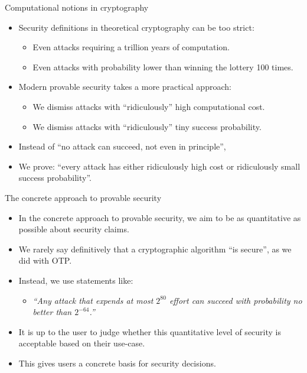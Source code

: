 \documentclass[aspectratio=169, lualatex, handout]{beamer}
\begin{document}
\begin{frame}{Computational notions in cryptography}
	\begin{itemize}
		\item Security definitions in theoretical cryptography can be too strict:
		      \begin{itemize}
			      \item Even attacks requiring a trillion years of computation.
			      \item Even attacks with probability lower than winning the lottery 100 times.
		      \end{itemize}
		\item Modern provable security takes a more practical approach:
		      \begin{itemize}
			      \item We dismiss attacks with ``ridiculously'' high computational cost.
			      \item We dismiss attacks with ``ridiculously'' tiny success probability.
		      \end{itemize}
		\item Instead of ``no attack can succeed, not even in principle'',
		\item We prove: ``every attack has either ridiculously high cost or ridiculously small success probability''.
	\end{itemize}
\end{frame}

\begin{frame}{The concrete approach to provable security}
	\begin{itemize}
		\item In the concrete approach to provable security, we aim to be as quantitative as possible about security claims.
		\item We rarely say definitively that a cryptographic algorithm ``is secure'', as we did with OTP.
		\item Instead, we use statements like:
		      \begin{itemize}
			      \item \textit{``Any attack that expends at most $2^{80}$ effort can succeed with probability no better than $2^{-64}$.''}
		      \end{itemize}
		\item It is up to the user to judge whether this quantitative level of security is acceptable based on their use-case.
		\item This gives users a concrete basis for security decisions.
	\end{itemize}
\end{frame}
\end{document}
